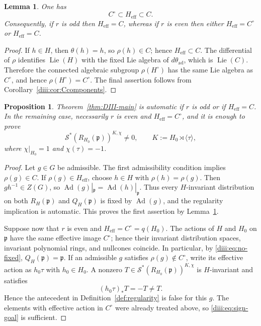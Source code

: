 \documentclass[11pt,reqno]{amsart}
\numberwithin{equation}{section}
\newtheorem{proposition}[theorem]{Proposition}
\newtheorem{lemma}[theorem]{Lemma}
\theoremstyle{definition}
\theoremstyle{remark}
\newcommand{\Ad}{\operatorname{Ad}}
\newcommand{\fp}{\mathfrak p}
\newcommand{\cS}{\mathcal S}
\begin{document}
\begin{lemma}\label{diii:lem:Heff}
One has
\[
  C^\circ\subset H_{\mathrm{eff}}\subset C.
\]
Consequently, if $r$ is odd then $H_{\mathrm{eff}}=C$, whereas if $r$ is even then either $H_{\mathrm{eff}}=C^\circ$ or $H_{\mathrm{eff}}=C$.
\end{lemma}

\begin{proof}
If $h\in H$, then $\theta(h)=h$, so $\rho(h)\in C$; hence
$H_{\mathrm{eff}}\subset C$.  The differential of $\rho$ identifies
$\operatorname{Lie}(H)$ with the fixed Lie algebra of $d\theta_{\mathrm{ad}}$, which is
$\operatorname{Lie}(C)$.  Therefore the connected algebraic subgroup
$\rho(H^\circ)$ has the same Lie algebra as $C^\circ$, and hence
$\rho(H^\circ)=C^\circ$.  The final assertion follows from
Corollary~\ref{diii:cor:Ccomponents}.
\end{proof}

\begin{proposition}\label{diii:prop:effective-reduction}
Theorem~\ref{thm:DIII-main} is automatic if $r$ is odd or if
$H_{\mathrm{eff}}=C$.  In the remaining case, necessarily $r$ is even and
$H_{\mathrm{eff}}=C^\circ$, and it is enough to prove
\begin{equation}\label{diii:eq:sign-goal}
  \cS^*(R_{H_0}(\fp))^{K,\chi}\ne0,
  \qquad
  K:=H_0\rtimes\langle\tau\rangle,
\end{equation}
where $\chi|_{H_0}=1$ and $\chi(\tau)=-1$.
\end{proposition}

\begin{proof}
Let $g\in G$ be admissible.  The first admissibility condition implies
$\rho(g)\in C$.  If $\rho(g)\in H_{\mathrm{eff}}$, choose $h\in H$ with
$\rho(h)=\rho(g)$.  Then $gh^{-1}\in Z(G)$, so
$\Ad(g)|_{\fp}=\Ad(h)|_{\fp}$.  Thus every $H$-invariant distribution on both
$R_H(\fp)$ and $Q_H(\fp)$ is fixed by $\Ad(g)$, and the regularity implication is automatic.  This proves the first assertion by Lemma~\ref{diii:lem:Heff}.

Suppose now that $r$ is even and $H_{\mathrm{eff}}=C^\circ=q(H_0)$.  The actions of $H$ and $H_0$ on $\fp$ have the same effective image $C^\circ$; hence their invariant distribution spaces, invariant polynomial rings, and nullcones coincide.  In particular, by \eqref{diii:eq:no-fixed}, $Q_H(\fp)=\fp$.  If an admissible $g$ satisfies $\rho(g)\notin C^\circ$, write its effective action as $h_0\tau$ with $h_0\in H_0$.  A nonzero
$T\in\cS^*(R_{H_0}(\fp))^{K,\chi}$ is $H$-invariant and satisfies
\[
  (h_0\tau)_*T=-T\ne T.
\]
Hence the antecedent in Definition~\ref{def:regularity} is false for this $g$.  The elements with effective action in $C^\circ$ were already treated above, so \eqref{diii:eq:sign-goal} is sufficient.
\end{proof}
\end{document}

